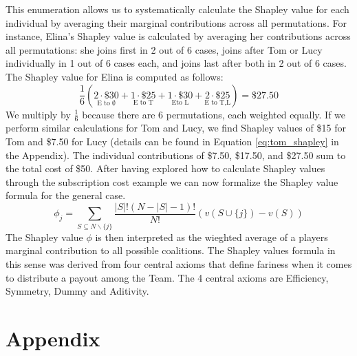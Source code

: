 \documentclass[12pt]{article}
\begin{document}
 This enumeration allows us to systematically calculate the Shapley value for each individual by averaging their marginal contributions across all permutations. 
For instance, Elina's Shapley value is calculated by averaging her contributions across all permutations: she joins first in 2 out of 6 cases, joins after Tom or Lucy individually in 1 out of 6 cases each, and joins last after both in 2 out of 6 cases. The Shapley value for Elina is computed as follows:
$$
\frac{1}{6} \left( 
\underset{\text{E to } \emptyset}{2 \cdot \$30} + 
\underset{\text{E to T}}{1 \cdot \$25} + 
\underset{\text{Eto L}}{1 \cdot \$30} + 
\underset{\text{E to T,L}}{2 \cdot \$25} 
\right) = \$27.50
$$
We multiply by $\frac{1}{6}$ because there are 6 permutations, each weighted equally. If we perform similar calculations for Tom and Lucy, we find Shapley values of \$15 for Tom and \$7.50 for Lucy (details can be found in Equation \ref{eq:tom_shapley} in the Appendix). The individual contributions of \$7.50, \$17.50, and \$27.50 sum to the total cost of \$50. 
After having explored how to calculate Shapley values through the subscription cost example we can now formalize the Shapley value formula for the general case. 
\begin{equation}
	\phi_j = \sum_{S \subseteq N\backslash\{j\}} \frac{|S|!(N - |S| - 1)!}{N!}(v(S \cup \{j\}) - v(S)) 
\end{equation}
The Shapley value $\phi$ is then interpreted as the wieghted average of a players marginal contribution to all possible coalitions. 
The Shapley values formula in this sense was derived from four central axioms that define fariness when it comes to distribute a payout among the Team. The 4 central axioms are Efficiency, Symmetry, Dummy and Aditivity. 




\newpage
\section{Appendix}
\end{document}
